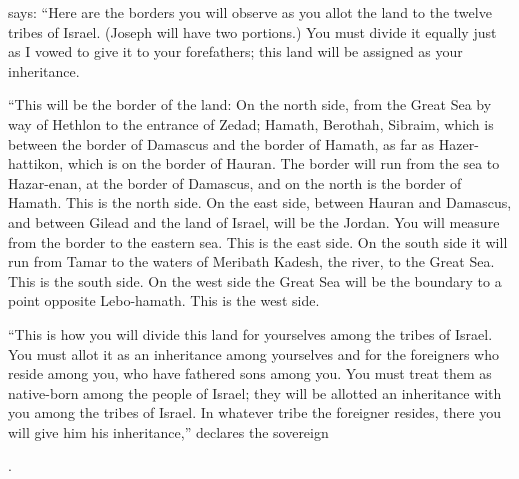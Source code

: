 {{}
says: “Here are the borders
you will observe as you allot
the land
to the twelve
tribes
of Israel.
(Joseph
will have two
portions.)
You must divide
it equally just as I vowed
to give
it to your forefathers;
this
land
will be assigned
as your inheritance.
\par }{\PP {}“This
will be the border
of the land: On the north
side,
from
the Great
Sea
by way
of Hethlon
to the entrance
of Zedad;
Hamath,
Berothah,
Sibraim,
which
is between
the border
of Damascus
and the border
of Hamath,
as far as Hazer-hattikon,
which
is on the border
of Hauran.
The border
will
run from
the sea
to Hazar-enan,
at the border
of Damascus,
and on the north
is the border
of Hamath.
This is the north
side.
On
the east
side,
between
Hauran
and Damascus,
and between
Gilead
and the land
of Israel,
will be the Jordan.
You will measure
from
the border
to the eastern
sea.
This is the east
side.
On the south
side it will run from Tamar
to
the waters
of Meribath
Kadesh,
the river,
to
the Great
Sea.
This is the south
side.
On the west
side
the Great
Sea
will be the boundary
to
a point opposite
Lebo-hamath.
This
is the west
side.
\par }{\PP {}“This is how you will divide
this
land
for yourselves among the tribes
of Israel.
You must allot
it as an inheritance
among yourselves and for the foreigners
who reside
among
you, who have
fathered
sons
among
you. You must treat them as native-born
among the people of Israel;
they will be allotted
an inheritance
with you
among
the tribes
of Israel.
In whatever
tribe
the foreigner
resides,
there
you will give
him his inheritance,”
declares
the sovereign

{}.

}
